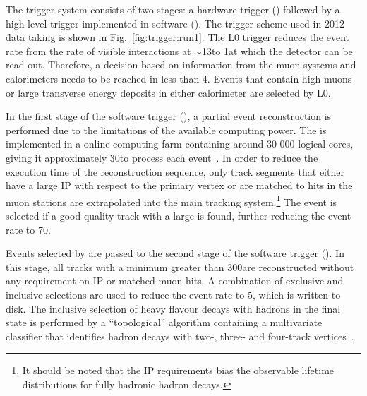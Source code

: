 The trigger system consists of two stages: a hardware trigger (\lone) followed by a high-level trigger implemented in software (\hlt). The trigger scheme used in 2012 data taking is shown in Fig.~\ref{fig:trigger:run1}. The L0 trigger reduces the event rate from the rate of visible interactions at $\sim$13\mhz to 1\mhz at which the \lhcb detector can be read out. Therefore, a decision based on information from the muon systems and calorimeters needs to be reached in less than 4\mus. Events that contain high \pt muons or large transverse energy deposits in either calorimeter are selected by L0.

In the first stage of the software trigger (\hltone), a partial event reconstruction is performed due to the limitations of the available computing power. The \hlt is implemented in a online computing farm containing around 30 000 logical cores, giving it approximately 30\ms to process each event~\cite{trigger-cpu}. In order to reduce the execution time of the reconstruction sequence, only \velo track segments that either have a large IP with respect to the primary vertex or are matched to hits in the muon stations are extrapolated into the main tracking system.{\footnote{It should be noted that the IP requirements bias the observable lifetime distributions for fully hadronic \bquark hadron decays.}} The event is selected if a good quality track with a large \pt is found, further reducing the event rate to 70\khz. 

Events selected by \hltone are passed to the second stage of the software trigger (\hlttwo). In this stage, all tracks with a minimum \pt greater than 300\mevc are reconstructed without any requirement on IP or matched muon hits. A combination of exclusive and inclusive selections are used to reduce the event rate to 5\khz, which is written to disk. The inclusive selection of heavy flavour decays with hadrons in the final state is performed by a ``topological'' algorithm containing a multivariate classifier that identifies \bquark hadron decays with two-, three- and four-track vertices~\cite{trigger-inclusive,trigger-topo}.

